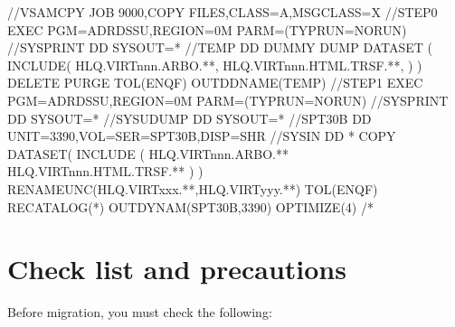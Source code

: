 \documentclass[letterpaper,10pt,english]{sphinxmanual}
\begin{document}
\begin{sphinxVerbatim}[commandchars=\\\{\}]
//\PYGZdl{}VSAMCPY JOB 9000,\PYGZsq{}COPY FILES\PYGZsq{},CLASS=A,MSGCLASS=X
//STEP0   EXEC PGM=ADRDSSU,REGION=0M PARM=(\PYGZsq{}TYPRUN=NORUN\PYGZsq{})
//SYSPRINT DD SYSOUT=*
//TEMP DD DUMMY
 DUMP DATASET              \PYGZhy{}
      (                    \PYGZhy{}
       INCLUDE(            \PYGZhy{}
      HLQ.VIRTnnn.ARBO.**, \PYGZhy{}
      HLQ.VIRTnnn.HTML.TRSF.**, \PYGZhy{}
                )         \PYGZhy{}
      )                   \PYGZhy{}
      DELETE    \PYGZhy{}
      PURGE      \PYGZhy{}
      TOL(ENQF) \PYGZhy{}
      OUTDDNAME(TEMP)
//STEP1   EXEC PGM=ADRDSSU,REGION=0M PARM=(\PYGZsq{}TYPRUN=NORUN\PYGZsq{})
//SYSPRINT DD  SYSOUT=*
//SYSUDUMP DD  SYSOUT=*
//SPT30B   DD  UNIT=3390,VOL=SER=SPT30B,DISP=SHR
//SYSIN    DD  *
 COPY                                             \PYGZhy{}
       DATASET(                                   \PYGZhy{}
       INCLUDE (                                  \PYGZhy{}
       HLQ.VIRTnnn.ARBO.**                    \PYGZhy{}
       HLQ.VIRTnnn.HTML.TRSF.**               \PYGZhy{}
  )                                               \PYGZhy{}
  )\PYGZhy{}
  RENAMEUNC(HLQ.VIRTxxx.**,HLQ.VIRTyyy.**) \PYGZhy{}
  TOL(ENQF)   \PYGZhy{}
  RECATALOG(*) \PYGZhy{}
  OUTDYNAM(SPT30B,3390) \PYGZhy{}
  OPTIMIZE(4)
/*
\end{sphinxVerbatim}

\sphinxAtStartPar
{}

\newpage

\ignorespaces 

\chapter{Check list and precautions}
\label{\detokenize{Migration_Guide:check-list-and-precautions}}\label{\detokenize{Migration_Guide:index-2}}
\sphinxAtStartPar
Before migration, you must check the following:\sphinxhyphen{}
\end{document}
